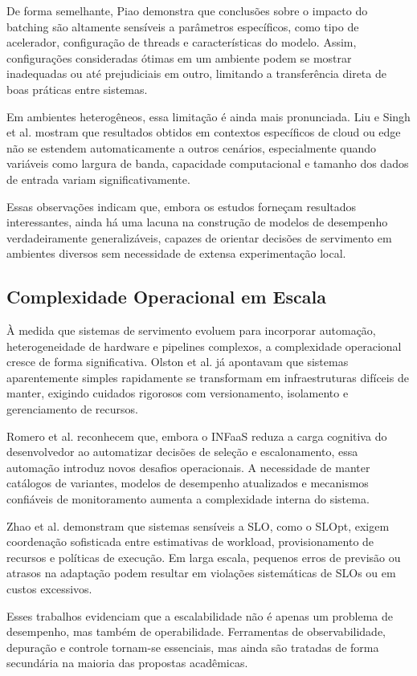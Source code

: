 De forma semelhante, Piao demonstra que conclusões sobre o impacto do batching são altamente sensíveis a parâmetros específicos, como tipo de acelerador, configuração de threads e características do modelo. Assim, configurações consideradas ótimas em um ambiente podem se mostrar inadequadas ou até prejudiciais em outro, limitando a transferência direta de boas práticas entre sistemas.

Em ambientes heterogêneos, essa limitação é ainda mais pronunciada. Liu e Singh et al. mostram que resultados obtidos em contextos específicos de cloud ou edge não se estendem automaticamente a outros cenários, especialmente quando variáveis como largura de banda, capacidade computacional e tamanho dos dados de entrada variam significativamente.

Essas observações indicam que, embora os estudos forneçam resultados interessantes, ainda há uma lacuna na construção de modelos de desempenho verdadeiramente generalizáveis, capazes de orientar decisões de servimento em ambientes diversos sem necessidade de extensa experimentação local.
\subsection{Complexidade Operacional em Escala}
À medida que sistemas de servimento evoluem para incorporar automação, heterogeneidade de hardware e pipelines complexos, a complexidade operacional cresce de forma significativa. Olston et al. já apontavam que sistemas aparentemente simples rapidamente se transformam em infraestruturas difíceis de manter, exigindo cuidados rigorosos com versionamento, isolamento e gerenciamento de recursos.

Romero et al. reconhecem que, embora o INFaaS reduza a carga cognitiva do desenvolvedor ao automatizar decisões de seleção e escalonamento, essa automação introduz novos desafios operacionais. A necessidade de manter catálogos de variantes, modelos de desempenho atualizados e mecanismos confiáveis de monitoramento aumenta a complexidade interna do sistema.

Zhao et al. demonstram que sistemas sensíveis a SLO, como o SLOpt, exigem coordenação sofisticada entre estimativas de workload, provisionamento de recursos e políticas de execução. Em larga escala, pequenos erros de previsão ou atrasos na adaptação podem resultar em violações sistemáticas de SLOs ou em custos excessivos.

Esses trabalhos evidenciam que a escalabilidade não é apenas um problema de desempenho, mas também de operabilidade. Ferramentas de observabilidade, depuração e controle tornam-se essenciais, mas ainda são tratadas de forma secundária na maioria das propostas acadêmicas.
